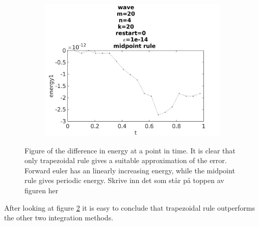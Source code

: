 \begin{figure}[H]
\begin{subfigure}[b]{0.30\textwidth}
                \includegraphics[width=\textwidth]{../MATLAB/fig/energyovertimemidpoint.jpg}
                \caption{  }
                \label{fig:errormid}
        \end{subfigure}
        \caption{Figure of the difference in energy at a point in time. It is clear that only trapezoidal rule gives a suitable approximation of the error. Forward euler has an linearly increasing energy, while the midpoint rule gives periodic energy.  Skrive inn det som står på toppen av figuren her}
        \label{fig:error}
\end{figure}
After looking at figure \ref{fig:error} it is easy to conclude that trapezoidal rule outperforms the other two integration methods.